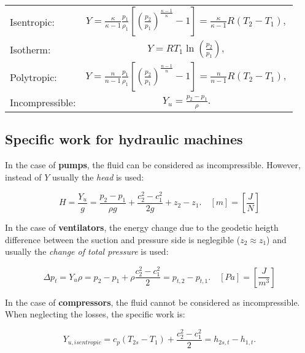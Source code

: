 \begin{center}
	\begin{tabular}{lc}

	Isentropic: & $Y = \frac{\kappa}{\kappa-1}\frac{p_1}{\rho_1} \left[\left(\frac{p_2}{p_1}\right)^{\frac{\kappa-1}{\kappa}}-1\right] = \frac{\kappa}{\kappa-1} R \left(T_2-T_1\right),$ \\ [0.8cm]
	Isotherm: & $Y = R T_1 \ln\left( \frac{p_2}{p_1}\right),$\\[0.8cm]
	Polytropic: &  $Y = \frac{n}{n-1}\frac{p_1}{\rho_1} \left[\left(\frac{p_2}{p_1}\right)^{\frac{n-1}{n}}-1\right]=\frac{n}{n-1} R \left( T_2-T_1\right),$\\[0.8cm]
	Incompressible: & $Y_u = \frac{p_2-p_1}{\rho}.$\\[0.8cm]

	\end{tabular}
\end{center}


\subsection{Specific work for hydraulic machines}

In the case of {\bf pumps}, the fluid can be considered as incompressible. However, instead of $Y$ usually the \emph{head} is used:

\begin{equation}
H=\frac{Y_u}{g}=\frac{p_2-p_1}{\rho g}+\frac{c_2^2-c_1^2}{2g}+z_2-z_1.\quad [m]=\left[ \frac{J}{N}\right]
\end{equation}

In the case of {\bf ventilators}, the energy change due to the geodetic heigth difference between the suction and pressure side is neglegible ($z_2 \approx z_1$) and usually the \emph{change of total pressure} is used:

\begin{equation}
\Delta p_t=Y_u \rho=p_2-p_1+\rho\frac{c_2^2-c_1^2}{2}=p_{t,2}-p_{t,1}. \quad [Pa]=\left[ \frac{J}{m^3}\right]
\end{equation}

In the case of {\bf compressors}, the fluid cannot be considered as incompressible. When neglecting the losses, the specific work is:

\begin{equation}
Y_{u,isentropic}=c_p\left(T_{2s}-T_1\right) +\frac{c_2^2-c_1^2}{2}=h_{2s,t}-h_{1,t}.
\end{equation}

